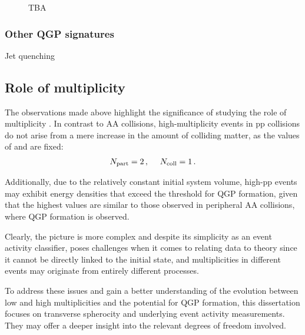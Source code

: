 \begin{figure}[H]
\caption{TBA}
\label{fig:colls:ssupsilon}
\end{figure}

\subsubsection{Other QGP signatures}

Jet quenching

\subsection{Role of multiplicity}

The observations made above highlight the significance of studying the role of multiplicity \Nch. In contrast to AA collisions, high-multiplicity events in pp collisions do not arise from a mere increase in the amount of colliding matter, as the values of \Npart and \Ncoll are fixed:
\begin{align}
N_\mathrm{part} = 2 \, ,\quad \ N_\mathrm{coll} = 1 \, .
\end{align} 

Additionally, due to the relatively constant initial system volume, high-\Nch pp events may exhibit energy densities that exceed the threshold for QGP formation, given that the highest \Nch values are similar to those observed in peripheral AA collisions, where QGP formation is observed.

Clearly, the picture is more complex and despite its simplicity as an event activity classifier, \Nch poses challenges when it comes to relating data to theory since it cannot be directly linked to the initial state, and multiplicities in different events may originate from entirely different processes.

To address these issues and gain a better understanding of the evolution between low and high multiplicities and the potential for QGP formation, this dissertation focuses on transverse spherocity \SOPT and underlying event activity \RT measurements. They may offer a deeper insight into the relevant degrees of freedom involved.


